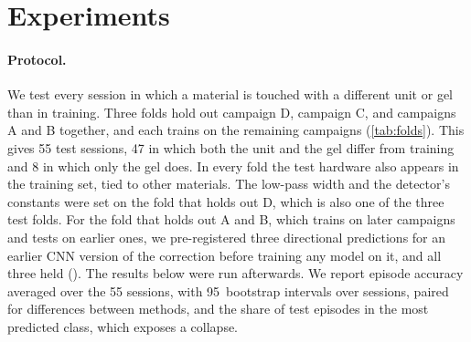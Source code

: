 \section{Experiments}
\label{sec:exp}

\paragraph{Protocol.}
We test every session in which a material is touched with a different unit or gel than in training. Three folds hold out campaign D, campaign C, and campaigns A and B together, and each trains on the remaining campaigns (\cref{tab:folds}). This gives 55 test sessions, 47 in which both the unit and the gel differ from training and 8 in which only the gel does. In every fold the test hardware also appears in the training set, tied to other materials. The low-pass width and the detector's constants were set on the fold that holds out D, which is also one of the three test folds. For the fold that holds out A and B, which trains on later campaigns and tests on earlier ones, we pre-registered three directional predictions for an earlier CNN version of the correction before training any model on it, and all three held (). The results below were run afterwards. We report episode accuracy averaged over the 55 sessions, with 95\pct\ bootstrap intervals over sessions, paired for differences between methods, and the share of test episodes in the most predicted class, which exposes a collapse.

\begin{table}[t]
  \centering\footnotesize\setlength{\tabcolsep}{3.5pt}
  \caption{\textbf{The three folds.} Test sessions touch a material with a different unit or gel than in training (unit and gel: S1 against S2 or S3; gel: S2 against S3).}
  \label{tab:folds}
\end{table}

